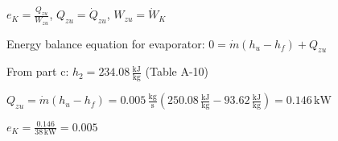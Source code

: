 \( e_K = \frac{Q_{zu}}{W_{zu}} \), \( Q_{zu} = \dot{Q}_{zu} \), \( W_{zu} = \dot{W}_K \)  

Energy balance equation for evaporator:  
\( 0 = \dot{m} (h_u - h_f) + Q_{zu} \)  

From part c: \( h_2 = 234.08 \, \frac{\text{kJ}}{\text{kg}} \) (Table A-10)  

\( Q_{zu} = \dot{m} (h_u - h_f) = 0.005 \, \frac{\text{kg}}{\text{s}} (250.08 \, \frac{\text{kJ}}{\text{kg}} - 93.62 \, \frac{\text{kJ}}{\text{kg}}) = 0.146 \, \text{kW} \)  

\( e_K = \frac{0.146}{38 \, \text{kW}} = 0.005 \)